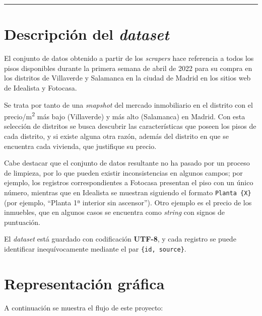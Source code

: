 \documentclass[12pt]{article}
\begin{document}
\begin{center}
	\vspace{-0.5cm}
	{\color{uocblue}\rule{0.75\linewidth}{1pt}}
	\vspace{-0.5cm}
\end{center}

\vspace{-1.5em}\section{Descripción del \textit{dataset}}\vspace{-1.0em}

El conjunto de datos obtenido a partir de los \textit{scrapers} hace referencia a todos los pisos disponibles durante la primera semana de abril de 2022 para su compra en los distritos de Villaverde y Salamanca en la ciudad de Madrid en los sitios web de Idealista y Fotocasa.

Se trata por tanto de una \textit{snapshot} del mercado inmobiliario en el distrito con el precio/m\textsuperscript{2} más bajo (Villaverde) y más alto (Salamanca) en Madrid. Con esta selección de distritos se busca descubrir las características que poseen los pisos de cada distrito, y si existe alguna otra razón, además del distrito en que se encuentra cada vivienda, que justifique su precio.

Cabe destacar que el conjunto de datos resultante no ha pasado por un proceso de limpieza, por lo que pueden existir inconsistencias en algunos campos; por ejemplo, los registros correspondientes a Fotocasa presentan el piso con un único número, mientras que en Idealista se muestran siguiendo el formato \verb|Planta {X}| (por ejemplo, ``Planta 1ª interior sin ascensor''). Otro ejemplo es el precio de los inmuebles, que en algunos casos se encuentra como \textit{string} con signos de puntuación.

El \textit{dataset} está guardado con codificación \textbf{UTF-8}, y cada registro se puede identificar inequívocamente mediante el par \verb|{id, source}|.

\vspace{-1.5em}\section{Representación gráfica}\vspace{-1.0em}

A continuación se muestra el flujo de este proyecto:
\end{document}
